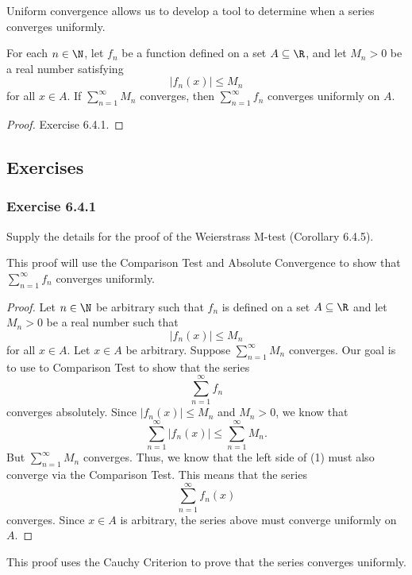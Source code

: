Uniform convergence allows us to develop a tool to determine when a series converges uniformly.

\begin{tcolorbox}
    \begin{cor}
    For each \( n \in \N  \), let \( f_n  \) be a function defined on a set \( A \subseteq \R  \), and let \( M_n > 0  \) be a real number satisfying
    \[  | f_n(x)  | \leq M_n \] for all \( x \in A  \). If \( \sum_{ n=1 }^{ \infty  } M_n  \) converges, then \( \sum_{ n=1 }^{ \infty  } f_n  \) converges uniformly on \( A  \).
    \end{cor}
\end{tcolorbox}

\begin{proof}
Exercise 6.4.1.
\end{proof}

\subsection{Exercises}

\subsubsection{Exercise 6.4.1} Supply the details for the proof of the Weierstrass M-test (Corollary 6.4.5).

This proof will use the Comparison Test and Absolute Convergence to show that \( \sum_{ n=1 }^{ \infty  } f_n  \) converges uniformly.
\begin{proof}
Let \( n \in \N  \) be arbitrary such that \( f_n  \) is defined on a set \( A \subseteq \R  \) and let \( M_n > 0  \) be a real number such that 
\[  | f_n(x)  |  \leq M_n \]
for all \( x \in A  \). Let \( x \in A  \) be arbitrary. Suppose \( \sum_{ n=1 }^{ \infty  } M_n  \) converges. Our goal is to use to Comparison Test to show that the series 
\[  \sum_{ n=1 }^{ \infty  } f_n  \] converges absolutely. Since \( | f_n(x)  |  \leq M_n  \) and \( M_n > 0  \), we know that
\[  \sum_{ n=1 }^{ \infty  } | f_n(x)  | \leq \sum_{ n=1 }^{ \infty  } M_n. \tag{1}\]
But \( \sum_{ n=1 }^{ \infty  } M_n  \) converges. Thus, we know that the left side of (1) must also converge via the Comparison Test. This means that the series 
\[  \sum_{ n=1 }^{ \infty  } f_n(x)  \] converges. Since \( x \in A  \) is arbitrary, the series above must converge uniformly on \( A  \).
\end{proof}

This proof uses the Cauchy Criterion to prove that the series converges uniformly.

